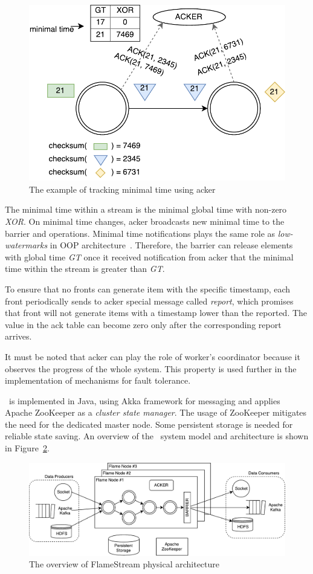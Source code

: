 \begin{figure}[htbp]
  \centering
  \includegraphics[scale=0.48]{pics/acker}
  \caption{The example of tracking minimal time using acker}
  \label {acker}
\end{figure}

The minimal time within a stream is the minimal global time with non-zero {\it XOR}. On minimal time changes, acker broadcasts new minimal time to the barrier and operations. Minimal time notifications plays the same role as {\em low-watermarks} in OOP architecture~\cite{Li:2008:OPN:1453856.1453890}. Therefore, the barrier can release elements with global time {\it GT} once it received notification from acker that the minimal time within the stream is greater than {\it GT}.

To ensure that no fronts can generate item with the specific timestamp, each front periodically sends to acker special message called {\it report}, which promises that front will not generate items with a timestamp lower than the reported. The value in the ack table can become zero only after the corresponding report arrives.

It must be noted that acker can play the role of worker's coordinator because it observes the progress of the whole system. This property is used further in the implementation of mechanisms for fault tolerance. 

\FlameStream\ is implemented in Java, using Akka framework for messaging and applies Apache ZooKeeper as a {\it cluster state manager}. The usage of ZooKeeper mitigates the need for the dedicated master node. Some persistent storage is needed for reliable state saving. An overview of the \FlameStream\ system model and architecture is shown in Figure~\ref{arch}.

\begin{figure}[htbp]
  \centering
  \includegraphics[scale=0.58]{pics/arch}
  \caption{The overview of FlameStream physical architecture}
  \label {arch}
\end{figure}

